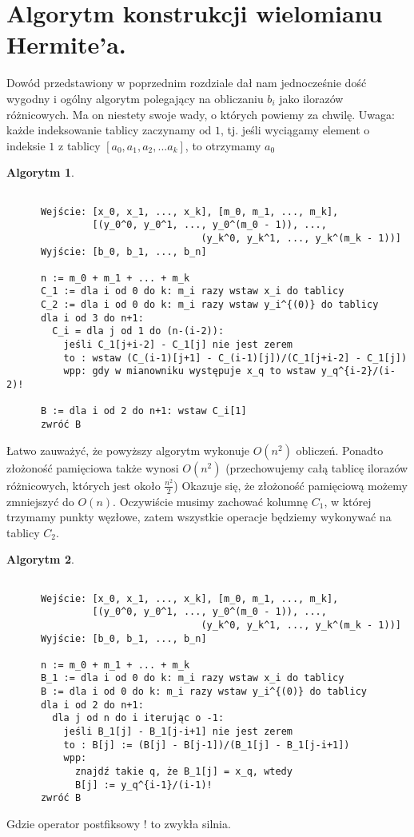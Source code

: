 \documentclass[10pt,wide]{mwart}
\theoremstyle{definition}
\newtheorem{alg}{Algorytm}
\begin{document}
 \section{Algorytm konstrukcji wielomianu Hermite'a.}
 Dowód przedstawiony w poprzednim rozdziale dał nam jednocześnie dość wygodny i ogólny algorytm polegający na obliczaniu \(b_i\) jako ilorazów różnicowych.
 Ma on niestety swoje wady, o których powiemy za chwilę.
 Uwaga: każde indeksowanie tablicy zaczynamy od \(1\), tj. jeśli wyciągamy element o indeksie \(1\) z tablicy \([a_0, a_1, a_2, ... a_k]\), to otrzymamy \(a_0\)
\begin{alg}
  \begin{verbatim}

      Wejście: [x_0, x_1, ..., x_k], [m_0, m_1, ..., m_k],
               [(y_0^0, y_0^1, ..., y_0^(m_0 - 1)), ...,
                                  (y_k^0, y_k^1, ..., y_k^(m_k - 1))]
      Wyjście: [b_0, b_1, ..., b_n]

      n := m_0 + m_1 + ... + m_k
      C_1 := dla i od 0 do k: m_i razy wstaw x_i do tablicy
      C_2 := dla i od 0 do k: m_i razy wstaw y_i^{(0)} do tablicy
      dla i od 3 do n+1:
        C_i = dla j od 1 do (n-(i-2)):
          jeśli C_1[j+i-2] - C_1[j] nie jest zerem
          to : wstaw (C_(i-1)[j+1] - C_(i-1)[j])/(C_1[j+i-2] - C_1[j])
          wpp: gdy w mianowniku występuje x_q to wstaw y_q^{i-2}/(i-2)!

      B := dla i od 2 do n+1: wstaw C_i[1]
      zwróć B
\end{verbatim}
\end{alg}
Łatwo zauważyć, że powyższy algorytm wykonuje \(O(n^2)\) obliczeń. Ponadto złożoność pamięciowa także wynosi \(O(n^2)\) (przechowujemy całą tablicę ilorazów różnicowych, których jest około \(\frac{n^2}{2}\))
Okazuje się, że złożoność pamięciową możemy zmniejszyć do \(O(n)\). Oczywiście musimy zachować kolumnę \(C_1\), w której trzymamy punkty węzłowe, zatem wszystkie operacje będziemy wykonywać na tablicy \(C_2\).
\begin{alg}
  \begin{verbatim}

      Wejście: [x_0, x_1, ..., x_k], [m_0, m_1, ..., m_k],
               [(y_0^0, y_0^1, ..., y_0^(m_0 - 1)), ...,
                                  (y_k^0, y_k^1, ..., y_k^(m_k - 1))]
      Wyjście: [b_0, b_1, ..., b_n]

      n := m_0 + m_1 + ... + m_k
      B_1 := dla i od 0 do k: m_i razy wstaw x_i do tablicy
      B := dla i od 0 do k: m_i razy wstaw y_i^{(0)} do tablicy
      dla i od 2 do n+1:
        dla j od n do i iterując o -1:
          jeśli B_1[j] - B_1[j-i+1] nie jest zerem
          to : B[j] := (B[j] - B[j-1])/(B_1[j] - B_1[j-i+1])
          wpp:
            znajdź takie q, że B_1[j] = x_q, wtedy
            B[j] := y_q^{i-1}/(i-1)!
      zwróć B
\end{verbatim}
\end{alg}
Gdzie operator postfiksowy ! to zwykła silnia.
\end{document}
